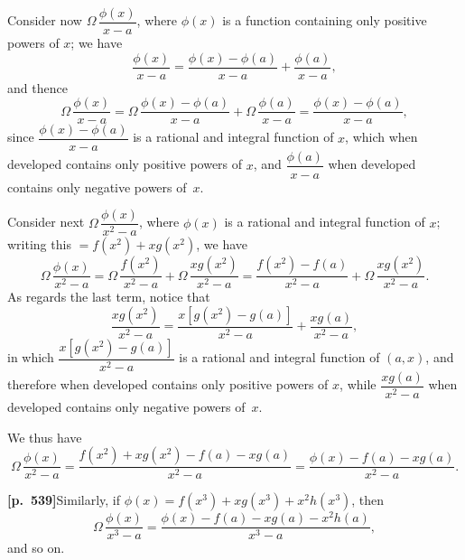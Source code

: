 \documentclass[11pt,a4paper]{article}
\begin{document}
Consider now $\Omega\,\dfrac{\phi(x)}{x - a}$, where $\phi(x)$ is a function containing only positive powers of $x$; we have
\[
\frac{\phi(x)}{x - a} = \frac{\phi(x) - \phi(a)}{x - a} + \frac{\phi(a)}{x - a},
\]
and thence
\[
\Omega\,\frac{\phi(x)}{x - a} = \Omega\,\frac{\phi(x) - \phi(a)}{x - a} + \Omega\,\frac{\phi(a)}{x - a} = \frac{\phi(x) - \phi(a)}{x - a},
\]
since $\dfrac{\phi(x) - \phi(a)}{x - a}$ is a rational and integral function of $x$, which when developed contains only positive powers of $x$, and $\dfrac{\phi(a)}{x - a}$ when developed contains only negative powers of~$x$.

Consider next $\Omega\,\dfrac{\phi(x)}{x^{2} - a}$, where $\phi(x)$ is a rational and integral function of $x$; writing this $= f(x^{2}) + x g(x^{2})$, we have
\[
\Omega\,\frac{\phi(x)}{x^{2} - a} = \Omega\,\frac{f(x^{2})}{x^{2} - a} + \Omega\,\frac{x g(x^{2})}{x^{2} - a} = \frac{f(x^{2}) - f(a)}{x^{2} - a} + \Omega\,\frac{x g(x^{2})}{x^{2} - a}.
\]
As regards the last term, notice that
\[
\frac{x g(x^{2})}{x^{2} - a} = \frac{x[g(x^{2}) - g(a)]}{x^{2} - a} + \frac{x g(a)}{x^{2} - a},
\]
in which $\dfrac{x[g(x^{2}) - g(a)]}{x^{2} - a}$ is a rational and integral function of $(a, x)$, and therefore when developed contains only positive powers of $x$, while $\dfrac{x g(a)}{x^{2} - a}$ when developed contains only negative powers of~$x$.

We thus have
\[
\Omega\,\frac{\phi(x)}{x^{2} - a} = \frac{f(x^{2}) + x g(x^{2}) - f(a) - x g(a)}{x^{2} - a} = \frac{\phi(x) - f(a) - x g(a)}{x^{2} - a}.
\]

\bigskip

\noindent\textbf{[p.~539]}\quad Similarly, if $\phi(x) = f(x^{3}) + x g(x^{3}) + x^{2} h(x^{3})$, then
\[
\Omega\,\frac{\phi(x)}{x^{3} - a} = \frac{\phi(x) - f(a) - x g(a) - x^{2} h(a)}{x^{3} - a},
\]
and so on.
\end{document}
